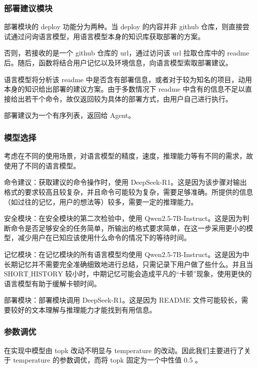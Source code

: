 \documentclass{article}
\theoremstyle{plain}
\theoremstyle{definition}
\theoremstyle{remark}
\begin{document}
\subsubsection{部署建议模块}

部署模块的 deploy 功能分为两种。当 deploy 的内容并非 github 仓库，则直接尝试通过问询语言模型，用语言模型本身的知识库获取部署的方案。

否则，若接收的是一个 github 仓库的 url，通过访问该 url 拉取仓库中的 readme 后。随后，函数将结合用户记忆以及环境信息，向语言模型索取部署建议。

语言模型将分析该 readme 中是否含有部署信息，或者对于较为知名的项目，动用本身的知识给出部署的建议方案。由于多数情况下 readme 中含有的信息不足以直接给出若干个命令，故仅返回较为具体的部署方式，由用户自己进行执行。

部署建议为一个有序列表，返回给 Agent。

\subsubsection{模型选择}

考虑在不同的使用场景，对语言模型的精度，速度，推理能力等有不同的需求，故使用了不同的语言模型。

命令建议：获取建议的命令操作时，使用 DeepSeek-R1。这是因为该步骤对输出格式的要求较高且较复杂，并且命令可能较为复杂，需要足够准确。所提供的信息（如过往的记忆，用户的想法等）较多，需要一定的推理能力。

安全模块：在安全模块的第二次检验中，使用 Qwen2.5-7B-Instruct。这是因为判断命令是否足够安全的任务简单，所输出的格式要求简单，在这一步采用更小的模型，减少用户在已知应该使用什么命令的情况下的等待时间。

记忆模块：在记忆模块的所有语言模型均使用 Qwen2.5-7B-Instruct。这是因为中长期记忆并不需要完全准确细致地进行总结，只需记录下用户做了些什么。并且当 $\text{SHORT\_HISTORY}$ 较小时，中期记忆可能会造成平凡的“卡顿”现象，使用更快的语言模型有助于缓解卡顿时间。

部署模块：部署模块调用 DeepSeek-R1。这是因为 README 文件可能较长，需要较好的文本理解与推理能力才能找到有用信息。

\subsubsection{参数调优}

在实现中模型由 topk 改动不明显与 temperature 的改动。因此我们主要进行了关于 temperature 的参数调优，而将 topk 固定为一个中性值 0.5 。
\end{document}
